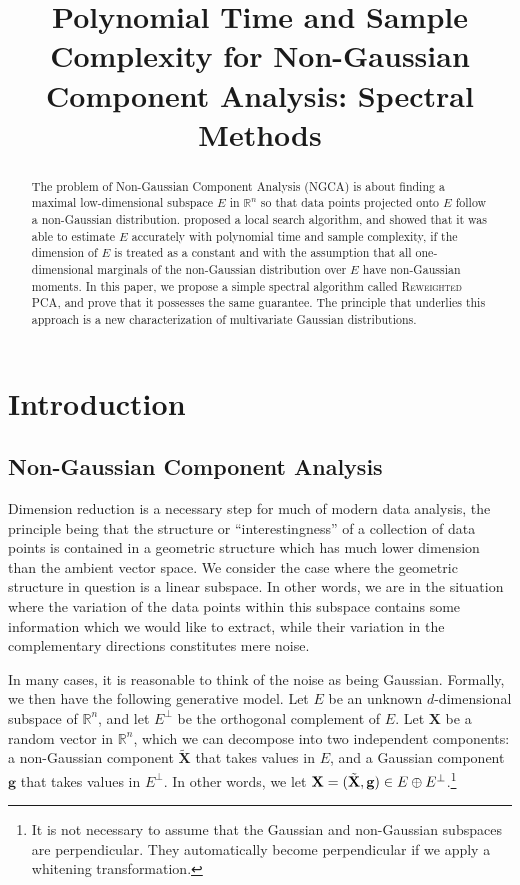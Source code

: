 \documentclass[final,12pt]{colt2018} %
\title[Polynomial Complexity for Non-Gaussian Component Analysis]{Polynomial Time and Sample Complexity for Non-Gaussian Component Analysis: Spectral Methods}
\numberwithin{equation}{section}
\DeclarePairedDelimiter{\paren}{(}{)}
\newcommand{\R}{\mathbb{R}}
\newcommand{\boldg}{\textbf{g}}
\newcommand{\boldX}{\textbf{X}}
\begin{document}
\maketitle

\begin{abstract}
	The problem of Non-Gaussian Component Analysis (NGCA) is about finding a maximal low-dimensional subspace $E$ in $\R^n$ so that data points projected onto $E$ follow a non-Gaussian distribution. \cite{Vempala2011} proposed a local search algorithm, and showed that it was able to estimate $E$ accurately with polynomial time and sample complexity, if the dimension of $E$ is treated as a constant and with the assumption that all one-dimensional marginals of the non-Gaussian distribution over $E$ have non-Gaussian moments. In this paper, we propose a simple spectral algorithm called \textsc{Reweighted PCA}, and prove that it possesses the same guarantee. The principle that underlies this approach is a new characterization of multivariate Gaussian distributions.
\end{abstract}

\section{Introduction}

\subsection{Non-Gaussian Component Analysis} Dimension reduction is a necessary step for much of modern data analysis, the principle being that the structure or ``interestingness'' of a collection of data points is contained in a geometric structure which has much lower dimension than the ambient vector space. We consider the case where the geometric structure in question is a linear subspace. In other words, we are in the situation where the variation of the data points within this subspace contains some information which we would like to extract, while their variation in the complementary directions constitutes mere noise.

In many cases, it is reasonable to think of the noise as being Gaussian. Formally, we then have the following generative model. Let $E$ be an unknown $d$-dimensional subspace of $\R^n$, and let $E^\perp$ be the orthogonal complement of $E$. 
Let $\boldX$ be a random vector in $\R^n$, which we can decompose into two independent components: a non-Gaussian component $\tilde{\boldX}$ that takes values in $E$, and a Gaussian component $\boldg$ that takes values in $E^\perp$. In other words, we let $\boldX = \paren{\tilde{\boldX},\boldg} \in E \oplus E^\perp$.\footnote{It is not necessary to assume that the Gaussian and non-Gaussian subspaces are perpendicular. They automatically become perpendicular if we apply a whitening transformation.}
\end{document}
